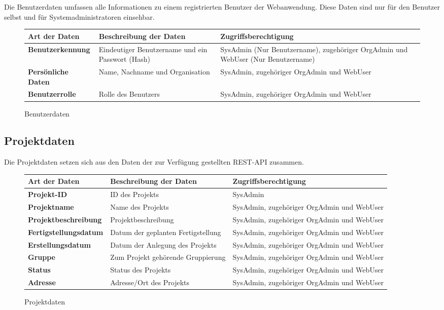Die Benutzerdaten umfassen alle Informationen zu einem registrierten Benutzer der Webanwendung. Diese Daten sind nur f\"ur den Benutzer selbst und f\"ur Systemadministratoren einsehbar.

\begin{figure}[h]
	\centering
	\begin{tabularx}{\textwidth}{| X || X | X |}
        \hline
		\textbf{Art der Daten} & \textbf{Beschreibung der Daten} & \textbf{Zugriffsberechtigung} \\ \hline \hline
		\textbf{Benutzerkennung} & Eindeutiger Benutzername und ein Passwort (Hash) & SysAdmin (Nur Benutzername), zugehöriger OrgAdmin und WebUser (Nur Benutzername) \\ \hline
		\textbf{Persönliche Daten} & Name, Nachname und Organisation & SysAdmin, zugehöriger OrgAdmin und WebUser \\ \hline
		\textbf{Benutzerrolle} & Rolle des Benutzers & SysAdmin, zugehöriger OrgAdmin und WebUser \\ \hline
	\end{tabularx}
	\caption{Benutzerdaten}
	\label{fig:Benutzerdaten}
\end{figure}

\newpage

\subsection{Projektdaten}

Die Projektdaten setzen sich aus den Daten der zur Verf\"ugung gestellten REST-API zusammen.

\begin{figure}[h]
	\centering
	\begin{tabularx}{\textwidth}{| X || X | X |}
        \hline
		\textbf{Art der Daten} & \textbf{Beschreibung der Daten} & \textbf{Zugriffsberechtigung} \\ \hline \hline
        \textbf{Projekt-ID} & ID des Projekts & SysAdmin \\ \hline
		\textbf{Projektname} & Name des Projekts & SysAdmin, zugehöriger OrgAdmin und WebUser \\ \hline
		\textbf{Projektbeschreibung} & Projektbeschreibung & SysAdmin, zugehöriger OrgAdmin und WebUser \\ \hline
		\textbf{Fertigstellungsdatum} & Datum der geplanten Fertigstellung & SysAdmin, zugehöriger OrgAdmin und WebUser \\ \hline
        \textbf{Erstellungsdatum} & Datum der Anlegung des Projekts & SysAdmin, zugehöriger OrgAdmin und WebUser \\ \hline
        \textbf{Gruppe} & Zum Projekt gehörende Gruppierung & SysAdmin, zugehöriger OrgAdmin und WebUser \\ \hline
        \textbf{Status} & Status des Projekts & SysAdmin, zugehöriger OrgAdmin und WebUser \\ \hline
        \textbf{Adresse} & Adresse/Ort des Projekts & SysAdmin, zugehöriger OrgAdmin und WebUser \\ \hline
	\end{tabularx}
	\caption{Projektdaten}
	\label{fig:Projektdaten}
\end{figure}

